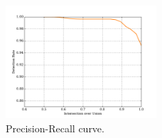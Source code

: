 \renewcommand{\captiontitle}{Precision-Recall curve}
\begin{figure}
\begin{center}
\includegraphics[width=0.5\textwidth]{./data/det_ROC_hgd_3.pdf}
\caption[\captiontitle]{\captiontitle{}.
}
\label{fig:roc}
\end{center}
\end{figure}

